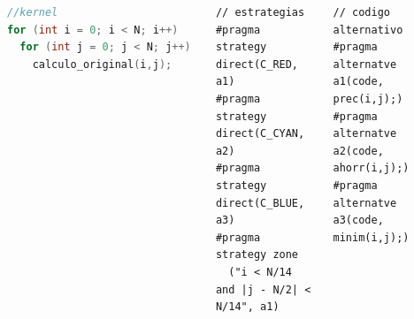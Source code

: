\documentclass{beamer}\usetheme{Madrid} %
\begin{document}
\begin{frame}[fragile]
\begin{columns}
\begin{center}
\end{center}
\begin{block}{}
\begin{lstlisting}[basicstyle=\scriptsize, language=C]
//kernel
for (int i = 0; i < N; i++)
  for (int j = 0; j < N; j++) 
    calculo_original(i,j);
\end{lstlisting}
\end{block}
\begin{block}{}
\begin{lstlisting}[basicstyle=\scriptsize]
// estrategias
#pragma strategy direct(C_RED, a1)
#pragma strategy direct(C_CYAN, a2)
#pragma strategy direct(C_BLUE, a3)
#pragma strategy zone
  ("i < N/14 and |j - N/2| < N/14", a1)
\end{lstlisting}
\end{block}
\begin{block}{}
\begin{lstlisting}[basicstyle=\scriptsize]
// codigo alternativo
#pragma alternatve a1(code, prec(i,j);)
#pragma alternatve a2(code, ahorr(i,j);)
#pragma alternatve a3(code, minim(i,j);)
\end{lstlisting}
\end{block}
\end{columns}
\end{frame}
\end{document}

